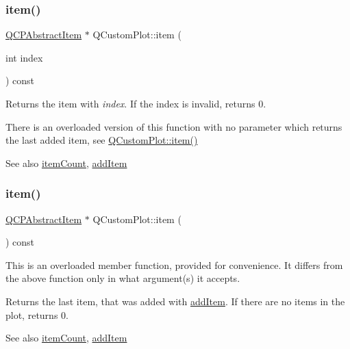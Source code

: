 \subsubsection{\texorpdfstring{item()}{item()}\hspace{0.1cm}{\footnotesize\ttfamily [1/2]}}
{\footnotesize\ttfamily \mbox{\hyperlink{class_q_c_p_abstract_item}{Q\+C\+P\+Abstract\+Item}} $\ast$ Q\+Custom\+Plot\+::item (\begin{DoxyParamCaption}\item[{int}]{index }\end{DoxyParamCaption}) const}

Returns the item with {\itshape index}. If the index is invalid, returns 0.

There is an overloaded version of this function with no parameter which returns the last added item, see \mbox{\hyperlink{class_q_custom_plot_ac042f2e78edd228ccf2f26b7fe215239}{Q\+Custom\+Plot\+::item()}}

\begin{DoxySeeAlso}{See also}
\mbox{\hyperlink{class_q_custom_plot_a16025daf0341f9362be3080e404424c2}{item\+Count}}, \mbox{\hyperlink{class_q_custom_plot_aa500620379262321685cb7a7674cbd2a}{add\+Item}} 
\end{DoxySeeAlso}
\mbox{\label{class_q_custom_plot_a12eb2a283cf10a8a9176c01c0443e83e}} 
\subsubsection{\texorpdfstring{item()}{item()}\hspace{0.1cm}{\footnotesize\ttfamily [2/2]}}
{\footnotesize\ttfamily \mbox{\hyperlink{class_q_c_p_abstract_item}{Q\+C\+P\+Abstract\+Item}} $\ast$ Q\+Custom\+Plot\+::item (\begin{DoxyParamCaption}{ }\end{DoxyParamCaption}) const}

This is an overloaded member function, provided for convenience. It differs from the above function only in what argument(s) it accepts.

Returns the last item, that was added with \mbox{\hyperlink{class_q_custom_plot_aa500620379262321685cb7a7674cbd2a}{add\+Item}}. If there are no items in the plot, returns 0.

\begin{DoxySeeAlso}{See also}
\mbox{\hyperlink{class_q_custom_plot_a16025daf0341f9362be3080e404424c2}{item\+Count}}, \mbox{\hyperlink{class_q_custom_plot_aa500620379262321685cb7a7674cbd2a}{add\+Item}} 
\end{DoxySeeAlso}
\mbox{\label{class_q_custom_plot_ac08578e0e6c059c83a8d340ba0038e8e}} 

